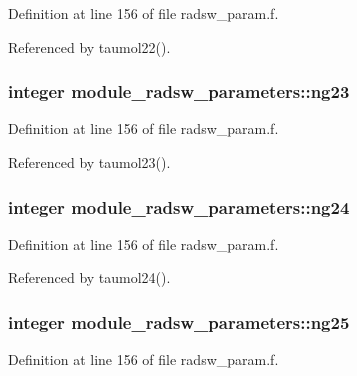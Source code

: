 Definition at line 156 of file radsw\+\_\+param.\+f.



Referenced by taumol22().

\subsubsection[{\texorpdfstring{ng23}{ng23}}]{\setlength{\rightskip}{0pt plus 5cm}integer module\+\_\+radsw\+\_\+parameters\+::ng23}\hypertarget{group__module__radsw__main_ga0c4f1d2f9438850994bcedb395d07f40}{}\label{group__module__radsw__main_ga0c4f1d2f9438850994bcedb395d07f40}


Definition at line 156 of file radsw\+\_\+param.\+f.



Referenced by taumol23().

\subsubsection[{\texorpdfstring{ng24}{ng24}}]{\setlength{\rightskip}{0pt plus 5cm}integer module\+\_\+radsw\+\_\+parameters\+::ng24}\hypertarget{group__module__radsw__main_gae25ce9a47816b83c6c57440747f1975f}{}\label{group__module__radsw__main_gae25ce9a47816b83c6c57440747f1975f}


Definition at line 156 of file radsw\+\_\+param.\+f.



Referenced by taumol24().

\subsubsection[{\texorpdfstring{ng25}{ng25}}]{\setlength{\rightskip}{0pt plus 5cm}integer module\+\_\+radsw\+\_\+parameters\+::ng25}\hypertarget{group__module__radsw__main_ga3361783dd00dc40ee9f93c7f428c4e58}{}\label{group__module__radsw__main_ga3361783dd00dc40ee9f93c7f428c4e58}


Definition at line 156 of file radsw\+\_\+param.\+f.



